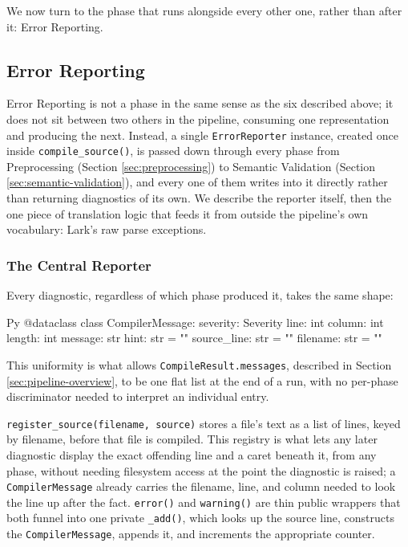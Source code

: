 We now turn to the phase that runs alongside every other one, rather than after it: Error Reporting.

\subsection{Error Reporting}
\label{sec:error-reporting}
Error Reporting is not a phase in the same sense as the six described above; it does not sit between two others in the pipeline, consuming one representation and producing the next. Instead, a single \lstinline|ErrorReporter| instance, created once inside \lstinline|compile_source()|, is passed down through every phase from Preprocessing (Section \ref{sec:preprocessing}) to Semantic Validation (Section \ref{sec:semantic-validation}), and every one of them writes into it directly rather than returning diagnostics of its own. We describe the reporter itself, then the one piece of translation logic that feeds it from outside the pipeline's own vocabulary: Lark's raw parse exceptions.

\subsubsection{The Central Reporter}
Every diagnostic, regardless of which phase produced it, takes the same shape:
\begin{codeblock}[]{Py}
@dataclass
class CompilerMessage:
    severity:    Severity
    line:        int
    column:      int
    length:      int
    message:     str
    hint:        str = ""
    source_line: str = ""
    filename:    str = ""
\end{codeblock}
This uniformity is what allows \lstinline|CompileResult.messages|, described in Section \ref{sec:pipeline-overview}, to be one flat list at the end of a run, with no per-phase discriminator needed to interpret an individual entry.

\lstinline|register_source(filename, source)| stores a file's text as a list of lines, keyed by filename, before that file is compiled. This registry is what lets any later diagnostic display the exact offending line and a caret beneath it, from any phase, without needing filesystem access at the point the diagnostic is raised; a \lstinline|CompilerMessage| already carries the filename, line, and column needed to look the line up after the fact. \lstinline|error()| and \lstinline|warning()| are thin public wrappers that both funnel into one private \lstinline|_add()|, which looks up the source line, constructs the \lstinline|CompilerMessage|, appends it, and increments the appropriate counter.


